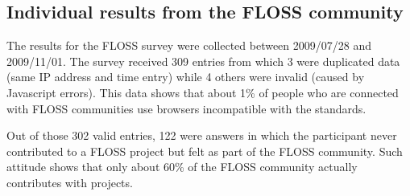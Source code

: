 \documentclass[lnbip]{svmultln}
\begin{document}
\subsection{Individual results from the FLOSS community}
\label{subsec:floss-results}

The results for the FLOSS survey were collected between 2009/07/28 and
2009/11/01. The survey received 309 entries from which 3 were
duplicated data (same IP address and time entry) while 4 others were
invalid (caused by Javascript errors). This data shows that about 1\%
of people who are connected with FLOSS communities use browsers
incompatible with the standards.

Out of those 302 valid entries, 122 were answers in which the
participant never contributed to a FLOSS project but felt as part of
the FLOSS community. Such attitude shows that only about 60\% of the
FLOSS community actually contributes with projects.
\end{document}
